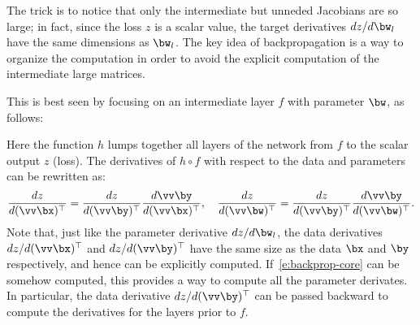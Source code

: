 The trick is to notice that only the intermediate but unneded Jacobians are so large; in fact, since the loss $z$ is a scalar value, the target derivatives $dz / d\bw_l$ have the same dimensions as $\bw_l$. The key idea of backpropagation is a way to organize the computation in order to avoid the explicit computation of the intermediate large matrices.

This is best seen by focusing on an intermediate layer $f$ with parameter $\bw$, as follows:
\begin{center}
\end{center}
Here the function $h$ lumps together all layers of the network from $f$ to the scalar output $z$ (loss). The derivatives of $h \circ f$ with respect to the data and parameters can be rewritten as:
\begin{equation}\label{e:backprop-core}
\frac{dz}{d(\vv \bx)^\top}
=
\frac{dz}{d(\vv \by)^\top}
\frac{d\vv \by}{d(\vv \bx)^\top},
\quad
\frac{dz}{d(\vv \bw)^\top}
=
\frac{dz}{d(\vv \by)^\top}
\frac{d\vv \by}{d(\vv \bw)^\top}.
\end{equation}
Note that, just like the parameter derivative $dz / d\bw_l$, the data derivatives $dz /d(\vv \bx)^\top$ and $dz / d(\vv \by)^\top$ have the same size as the data $\bx$ and $\by$ respectively, and hence can be explicitly computed. If~\eqref{e:backprop-core} can be somehow computed, this provides a way to compute all the parameter derivates. In particular, the data derivative $dz / d(\vv \by)^\top$ can be passed backward to compute the derivatives for the layers prior to $f$.

